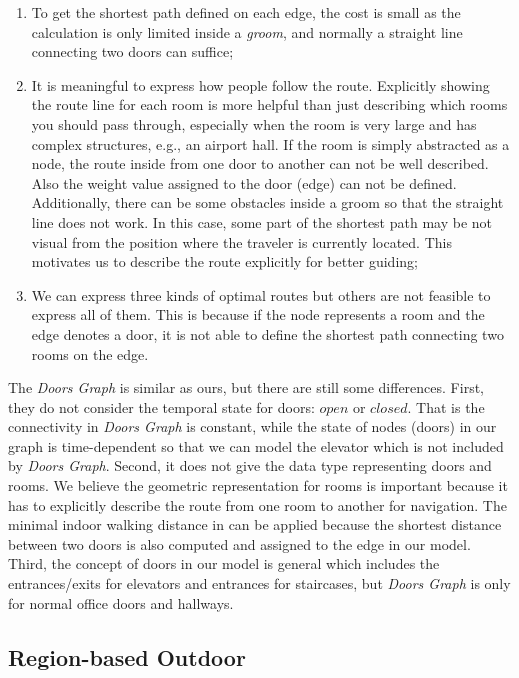 \begin{enumerate}
 \item To get the shortest path defined on each edge, the cost is small as the calculation is only limited inside a \textit{groom}, and normally a straight line connecting two doors can suffice; 

 \item  It is meaningful to express how people follow the route. 
Explicitly showing the route line for each room is more helpful than just describing which rooms
you should pass through, especially when the room is very large and has complex structures, 
e.g., an airport hall. If the room is simply abstracted as a node, the route inside from one door to another can not be well described. Also the weight value assigned to the door (edge) can not be defined. Additionally, there can be some obstacles inside a groom so that the straight line 
does not work. In this case, some part of the shortest path may be not visual from the position 
where the traveler is currently located. This motivates us to describe the route explicitly for 
better guiding;

 \item We can express three kinds of optimal routes but others are not feasible to express all of them.
 This is because if the node represents a room and the edge denotes a door, it is not able to define the shortest path connecting two rooms on the edge. 
\end{enumerate}


The \textit{Doors Graph} \cite{YLJ10} is similar as ours, but there are still
some differences. First, they do not consider the temporal state for doors: $open$ or $closed$. 
That is the connectivity in \textit{Doors Graph} is constant, while the state of nodes (doors) in our 
graph is time-dependent so that we can model the elevator which is not included by \textit{Doors Graph}. Second, it does not give the data type representing doors and rooms. 
We believe the geometric representation for rooms is important because it has to explicitly 
describe the route from one room to another for navigation. The minimal indoor walking 
distance in \cite{YLJ10} can be applied because the shortest distance between two doors is also computed and assigned to the edge in our model. Third, the concept of doors in our model is general which includes the entrances/exits for elevators and entrances for staircases, 
but \textit{Doors Graph} is only for normal office doors and hallways.
\subsection{Region-based Outdoor}
\label{regionbased}

